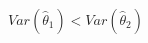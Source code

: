 \documentclass[preview]{standalone}
\begin{document}
\begin{align*}
Var(\hat{\theta}_1) < Var(\hat{\theta}_2)
\end{align*}
\end{document}
